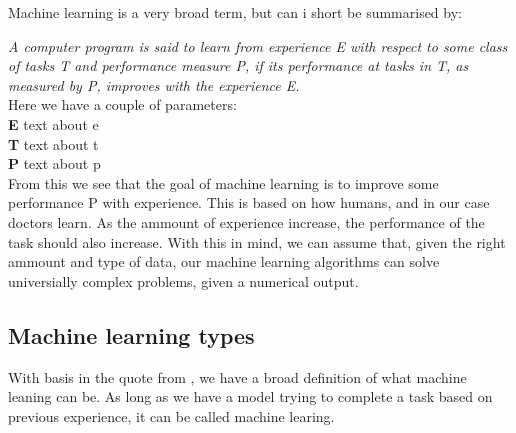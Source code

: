     
    Machine learning is a very broad term, but can i short be summarised by:\\
    \vspace{10px}
	
    \textit{ A computer program is said to learn from experience E with respect to 
    some class of tasks T and performance measure P, if its performance at
    tasks in T, as measured by P, improves with the experience E. } 
    \cite{MitchellTomM1997Ml}\\
	
    \vspace{10px}
    Here we have a couple of parameters:\\
    \textbf{E} text about e\\
    \textbf{T} text about t\\
    \textbf{P} text about p\\
	
    From this we see that the goal of machine learning is to improve some performance P with experience. This is based on how humans, and in our case doctors learn.
    As the ammount of experience increase, the performance of the task should also increase. 
    With this in mind, we can assume that, given the right ammount and type of data, our machine learning algorithms can solve universially complex problems, given a numerical output. 
    
\subsection{Machine learning types}
    With basis in the quote from \cite{MitchellTomM1997Ml}  , we have a broad definition of what machine leaning can be.
    As long as we have a model trying to complete a task based on previous experience, it can be called machine learing. 
    
	\begin{table}[h]
	    \centering
	    \caption{Machine leaning types}
	    \label{ML-types}
	  \end{table}
	  
